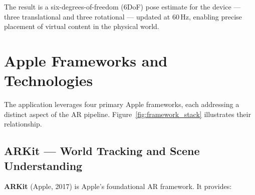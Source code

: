 The result is a six-degrees-of-freedom (6DoF) pose estimate for the device — three translational and three rotational — updated at 60\,Hz, enabling precise placement of virtual content in the physical world.


\section{Apple Frameworks and Technologies}
\label{sec:frameworks}

The application leverages four primary Apple frameworks, each addressing a distinct aspect of the AR pipeline. Figure~\ref{fig:framework_stack} illustrates their relationship.

\subsection{ARKit — World Tracking and Scene Understanding}
\label{subsec:arkit}

\textbf{ARKit} (Apple, 2017) is Apple's foundational AR framework. It provides:

